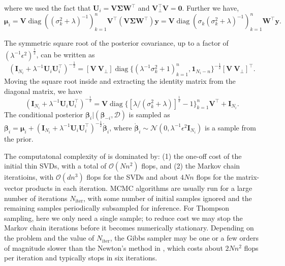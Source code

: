 \documentclass{article}
\DeclareMathOperator{\diag}{diag}
\begin{document}
where we used the fact that $\mathbf{U}_i = \mathbf{V} \boldsymbol{\Sigma} \mathbf{W}^\intercal$ and
$\mathbf{V}_\perp^\intercal \mathbf{V} = \mathbf{0}$.
Further we have,
\begin{equation}
\boldsymbol{\mu}_i = \mathbf{V} \diag((\sigma_k^2 + \lambda)^{-1})_{k=1}^n \mathbf{V}^\intercal
(\mathbf{V} \boldsymbol{\Sigma} \mathbf{W}^\intercal) \mathbf{y} =
\mathbf{V} \diag(\sigma_k (\sigma_k^2 + \lambda)^{-1})_{k=1}^n \mathbf{W}^\intercal \mathbf{y}.
\end{equation}

The symmetric square root of the posterior covariance,
up to a factor of %
$(\lambda^{-1} \epsilon^2)^{\frac{1}{2}}$, can be written as
\begin{equation*}
  (\mathbf{I}_{N_i} + \lambda^{-1} \mathbf{U}_i \mathbf{U}_i^\intercal)^{-\frac{1}{2}} =
  [\mathbf{V} \ \mathbf{V}_{\perp}] \diag\{\left(\lambda^{-1}\sigma_k^2 + 1\right)_{k=1}^n,
  \mathbf{1}_{N_i - n}\}^{-\frac{1}{2}} [\mathbf{V} \ \mathbf{V}_{\perp}]^\intercal.
\end{equation*}
Moving the square root inside and extracting the identity matrix from the diagonal matrix, we have
\begin{equation}
(\mathbf{I}_{N_i} + \lambda^{-1} \mathbf{U}_i \mathbf{U}_i^\intercal)^{-\frac{1}{2}} =
\mathbf{V} \diag\{[\lambda / (\sigma_k^2 + \lambda)]^{\frac{1}{2}} - 1\}_{k=1}^n
\mathbf{V}^\intercal + \mathbf{I}_{N_i}.
\end{equation}
The conditional posterior $\boldsymbol{\beta}_i | (\boldsymbol{\beta}_{-i}, \mathcal{D})$
is sampled as $\boldsymbol{\beta}_i = \boldsymbol{\mu}_i +
(\mathbf{I}_{N_i} + \lambda^{-1} \mathbf{U}_i \mathbf{U}_i^\intercal)^{-\frac{1}{2}}
\mathring{\boldsymbol{\beta}}_i$,
where $\mathring{\boldsymbol{\beta}}_i \sim \mathcal{N}(0, \lambda^{-1} \epsilon^2 \mathbf{I}_{N_i})$
is a sample from the prior.

The computatonal complexity of  is dominated by:
(1) the one-off cost of the initial thin SVDs, with a total of $\mathcal{O}(N n^2)$ flops, and
(2) the Markov chain iteratioins, with $\mathcal{O}(d n^3)$ flops for the SVDs
and about $4 N n$ flops for the matrix-vector products in each iteration.
MCMC algorithms are usually run for a large number of iterations $N_{\text{iter}}$,
with some number of initial samples ignored
and the remaining samples periodically subsampled for inference.
For Thompson sampling, here we only need a single sample;
to reduce cost we may stop the Markov chain iterations before it becomes numerically stationary.
Depending on the problem and the value of $N_{\text{iter}}$,
the Gibbs sampler may be one or a few orders of magnitude slower
than the Newton's method in ,
which costs about $2 N n^2$ flops per iteration and typically stops in six iterations.
\end{document}
